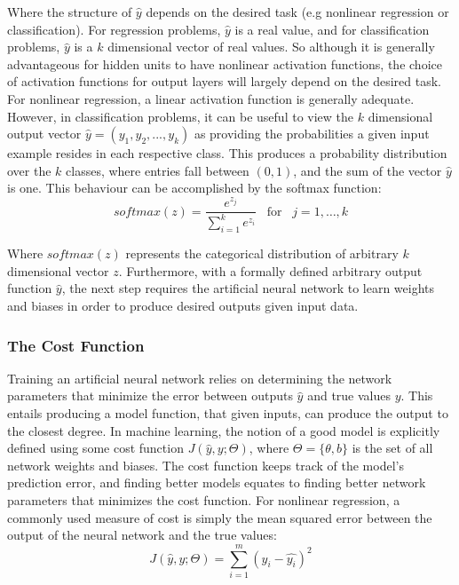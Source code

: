 Where the structure of $\hat{y}$ depends on the desired task (e.g nonlinear regression or classification). For regression problems, $\hat{y}$ is a real value, and for classification problems, $\hat{y}$ is a $k$ dimensional vector of real values. So although it is generally advantageous for hidden units to have nonlinear activation functions, the choice of activation functions for output layers will largely depend on the desired task. For nonlinear regression, a linear activation function is generally adequate. However, in classification problems, it can be useful to view the $k$ dimensional output vector $\hat{y} = (y_1,y_2,..., y_k)$ as providing the probabilities a given input example resides in each respective class. This produces a probability distribution over the $k$ classes, where entries fall between $(0,1)$, and the sum of the vector $\hat{y}$ is one. This behaviour can be accomplished by the softmax function:
\begin{equation}
       softmax(z) =  \frac{e^{z_j}}{\sum_{i=1}^{k}e^{z_i}} \;\;\; \mbox{for} \;\;\; j = 1,\ldots,k
\end{equation}

Where $softmax(z)$ represents the categorical distribution of arbitrary $k$ dimensional vector $z$. Furthermore, with a formally defined arbitrary output function $\hat{y}$, the next step requires the artificial neural network to learn weights and biases in order to produce desired outputs given input data.

\subsubsection{The Cost Function}
Training an artificial neural network relies on determining the network parameters that minimize the error between outputs $\hat{y}$ and true values $y$. This entails producing a model function, that given inputs, can produce the output to the closest degree. In machine learning, the notion of a good model is explicitly defined using some cost function $J(\hat{y},y;\Theta)$, where $\Theta = \{\theta, b\}$ is the set of all network weights and biases. The cost function keeps track of the model's prediction error, and finding better models equates to finding better network parameters that minimizes the cost function. For nonlinear regression, a commonly used measure of cost is simply the mean squared error between the output of the neural network and the true values:
\begin{equation} \label{eq:mse} 
    J(\hat{y},y;\Theta) = \sum_{i=1}^{m}(y_i - \hat{y_i})^{2}
\end{equation}


